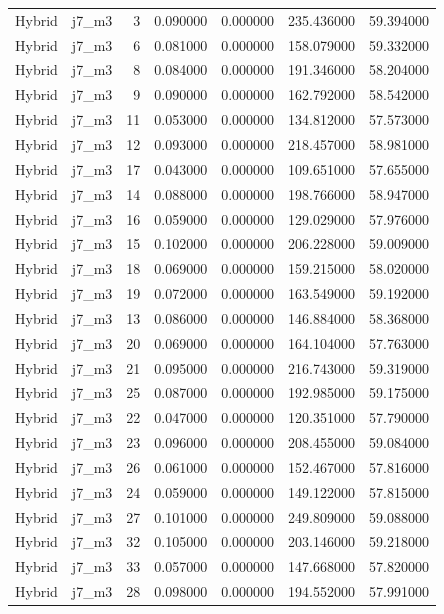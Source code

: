 \begin{tabular}{llrrrrr}
Hybrid & j7_m3 & 3 & 0.090000 & 0.000000 & 235.436000 & 59.394000 \\
Hybrid & j7_m3 & 6 & 0.081000 & 0.000000 & 158.079000 & 59.332000 \\
Hybrid & j7_m3 & 8 & 0.084000 & 0.000000 & 191.346000 & 58.204000 \\
Hybrid & j7_m3 & 9 & 0.090000 & 0.000000 & 162.792000 & 58.542000 \\
Hybrid & j7_m3 & 11 & 0.053000 & 0.000000 & 134.812000 & 57.573000 \\
Hybrid & j7_m3 & 12 & 0.093000 & 0.000000 & 218.457000 & 58.981000 \\
Hybrid & j7_m3 & 17 & 0.043000 & 0.000000 & 109.651000 & 57.655000 \\
Hybrid & j7_m3 & 14 & 0.088000 & 0.000000 & 198.766000 & 58.947000 \\
Hybrid & j7_m3 & 16 & 0.059000 & 0.000000 & 129.029000 & 57.976000 \\
Hybrid & j7_m3 & 15 & 0.102000 & 0.000000 & 206.228000 & 59.009000 \\
Hybrid & j7_m3 & 18 & 0.069000 & 0.000000 & 159.215000 & 58.020000 \\
Hybrid & j7_m3 & 19 & 0.072000 & 0.000000 & 163.549000 & 59.192000 \\
Hybrid & j7_m3 & 13 & 0.086000 & 0.000000 & 146.884000 & 58.368000 \\
Hybrid & j7_m3 & 20 & 0.069000 & 0.000000 & 164.104000 & 57.763000 \\
Hybrid & j7_m3 & 21 & 0.095000 & 0.000000 & 216.743000 & 59.319000 \\
Hybrid & j7_m3 & 25 & 0.087000 & 0.000000 & 192.985000 & 59.175000 \\
Hybrid & j7_m3 & 22 & 0.047000 & 0.000000 & 120.351000 & 57.790000 \\
Hybrid & j7_m3 & 23 & 0.096000 & 0.000000 & 208.455000 & 59.084000 \\
Hybrid & j7_m3 & 26 & 0.061000 & 0.000000 & 152.467000 & 57.816000 \\
Hybrid & j7_m3 & 24 & 0.059000 & 0.000000 & 149.122000 & 57.815000 \\
Hybrid & j7_m3 & 27 & 0.101000 & 0.000000 & 249.809000 & 59.088000 \\
Hybrid & j7_m3 & 32 & 0.105000 & 0.000000 & 203.146000 & 59.218000 \\
Hybrid & j7_m3 & 33 & 0.057000 & 0.000000 & 147.668000 & 57.820000 \\
Hybrid & j7_m3 & 28 & 0.098000 & 0.000000 & 194.552000 & 57.991000 \\

\end{tabular}
